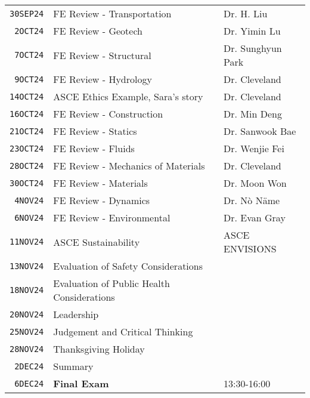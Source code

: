 \documentclass[12pt]{article}
\begin{document}
\begin{table}[ht!]
\begin{tabular}{p{0.5in}p{2.5in}p{4.0in}}
\texttt{30SEP24} & FE Review - Transportation & Dr. H. Liu \cite{NCEES2020}  \cite{Lindeburg2017}\\ %
\texttt{~2OCT24} & FE Review - Geotech & Dr. Yimin Lu \cite{NCEES2020}  \cite{Lindeburg2017}\\ %
\texttt{~7OCT24} & FE Review - Structural & Dr. Sunghyun Park \cite{NCEES2020} \cite{Lindeburg2017}\\ %
\texttt{~9OCT24} & FE Review - Hydrology & Dr. Cleveland \cite{NCEES2020} \cite{Lindeburg2017}\\  %
\texttt{14OCT24} & ASCE Ethics Example, Sara's story  & Dr. Cleveland \cite{ASCE2019}\\ %
\texttt{16OCT24} & FE Review - Construction &  Dr. Min Deng \cite{NCEES2020}  \cite{Lindeburg2017}\\ %
\texttt{21OCT24} & FE Review - Statics  & Dr. Sanwook Bae \cite{NCEES2020}  \cite{Lindeburg2017}\\ %
\texttt{23OCT24} & FE Review - Fluids & Dr. Wenjie Fei \cite{NCEES2020}  \cite{Lindeburg2017}\\ %
\texttt{28OCT24} & FE Review - Mechanics of Materials & Dr. Cleveland \cite{NCEES2020} \cite{Lindeburg2017}\\ %
\texttt{30OCT24} & FE Review - Materials & Dr. Moon Won \cite{NCEES2020}  \cite{Lindeburg2017}\\ %
\texttt{~4NOV24} & FE Review - Dynamics & Dr. N\`o N\"ame \cite{NCEES2020}  \cite{Lindeburg2017}\\ %
\texttt{~6NOV24} & FE Review - Environmental  & Dr. Evan Gray \cite{NCEES2020}  \cite{Lindeburg2017}\\ %
\texttt{11NOV24} & ASCE Sustainability & ASCE ENVISIONS \\ %
\texttt{13NOV24} & Evaluation of Safety Considerations &  \cite{ASCE2019} \\ %
\texttt{18NOV24} & Evaluation of Public Health Considerations &  \cite{ASCE2019}  \\ %
\texttt{20NOV24} & Leadership &  \\ %
\texttt{25NOV24} & Judgement and Critical Thinking & \cite{Critical2022} \\ %
\texttt{28NOV24} & Thanksgiving Holiday &    \\ %
\texttt{~2DEC24} & Summary & \\ %
\texttt{~6DEC24} & \textbf{Final Exam} & 13:30-16:00 \\ %
\hline
   \end{tabular}
   \label{tab:fall2013schedule}
\end{table}
\end{document}
